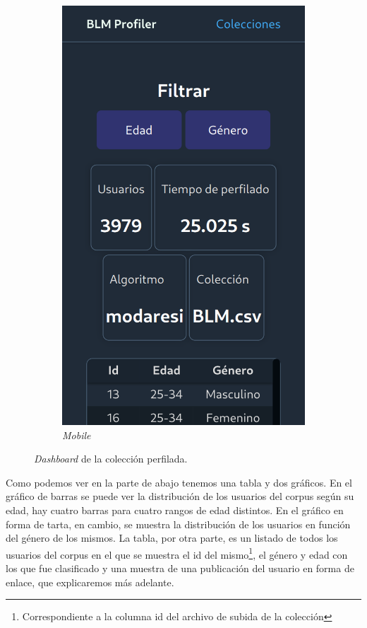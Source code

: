 \begin{figure}[H]
\begin{subfigure}{0.2215\textwidth}
   \includegraphics[width=\textwidth]{imaxes/capturas-app/mobile/dashboard.png}
  \caption{\textit{Mobile}} 
  \end{subfigure}
  \caption{\textit{Dashboard} de la colección perfilada.}
  \label{fig:app/dashboard}
\end{figure}

Como podemos ver en la parte de abajo tenemos una tabla y dos gráficos. En el gráfico de barras se puede ver la distribución de los usuarios del corpus según su edad, hay cuatro barras para cuatro rangos de edad distintos. En el gráfico en forma de tarta, en cambio, se muestra la distribución de los usuarios en función del género de los mismos. La tabla, por otra parte, es un listado de todos los usuarios del corpus en el que se muestra el id del mismo\footnote{Correspondiente a la columna id del archivo de subida de la colección}, el género y edad con los que fue clasificado y una muestra de una publicación del usuario en forma de enlace, que explicaremos más adelante.

